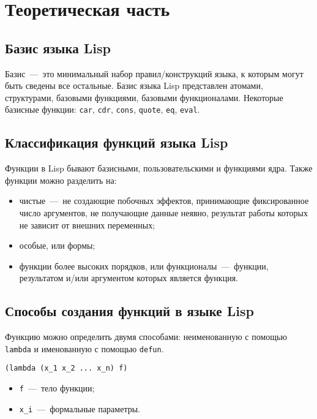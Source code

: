 \setcounter{page}{3}
\chapter{Теоретическая часть}
\section{Базис языка Lisp}
Базис~---~это минимальный набор правил/конструкций языка, к которым могут быть сведены все остальные. Базис языка Lisp представлен атомами, структурами, базовыми функциями, базовыми функционалами. Некоторые базисные функции: \texttt{car}, \texttt{cdr}, \texttt{cons}, \texttt{quote}, \texttt{eq}, \texttt{eval}.

\section{Классификация функций языка Lisp}
Функции в Lisp бывают базисными, пользовательскими и функциями ядра. Также функции можно разделить на:

\begin{itemize}
	\item чистые~---~не создающие побочных эффектов, принимающие фиксированное число аргументов, не получающие данные неявно, результат работы которых не зависит от внешних переменных;
	\item особые, или формы;
	\item функции более высоких порядков, или функционалы~---~функции, результатом и/или аргументом которых является функция.
\end{itemize}

\section{Способы создания функций в языке Lisp}
Функцию можно определить двумя способами: неименованную с помощью \texttt{lambda} и именованную с помощью \texttt{defun}.

\begin{code}
\begin{verbatim}
(lambda (x_1 x_2 ... x_n) f)
\end{verbatim}
\end{code}

\begin{itemize}
	\item \texttt{f}~---~тело функции;
	\item \texttt{x\_i}~---~формальные параметры.
\end{itemize}

